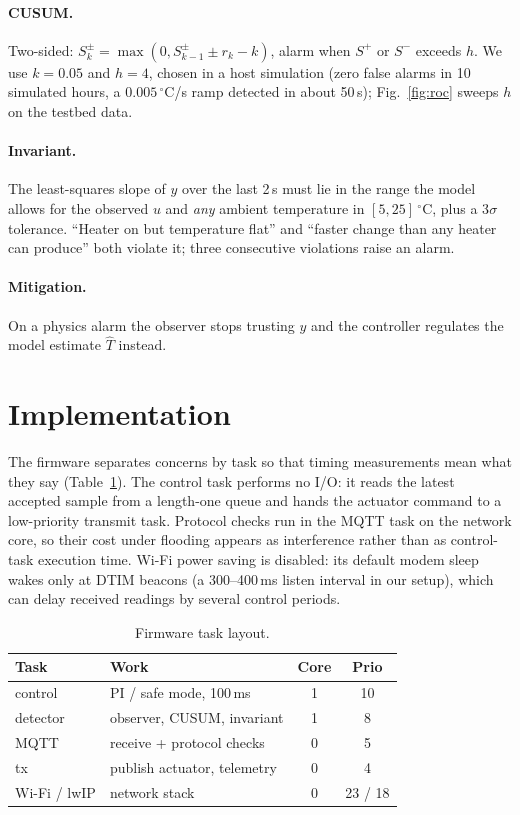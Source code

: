 \documentclass[10pt,twocolumn]{article}
\begin{document}
\paragraph{CUSUM.} Two-sided: $S^\pm_k = \max(0, S^\pm_{k-1} \pm r_k - k)$,
alarm when $S^+$ or $S^-$ exceeds $h$. We use $k=0.05$ and $h=4$, chosen in a
host simulation (zero false alarms in 10 simulated hours, a
$0.005\,^\circ$C/s ramp detected in about 50\,s); Fig.~\ref{fig:roc} sweeps $h$
on the testbed data.
\paragraph{Invariant.} The least-squares slope of $y$ over the last 2\,s must
lie in the range the model allows for the observed $u$ and \emph{any} ambient
temperature in $[5, 25]\,^\circ$C, plus a 3$\sigma$ tolerance. ``Heater on but
temperature flat'' and ``faster change than any heater can produce'' both
violate it; three consecutive violations raise an alarm.
\paragraph{Mitigation.} On a physics alarm the observer stops trusting $y$ and
the controller regulates the model estimate $\hat T$ instead.

\section{Implementation}
The firmware separates concerns by task so that timing measurements mean what
they say (Table~\ref{tab:tasks}). The control task performs no I/O: it reads the
latest accepted sample from a length-one queue and hands the actuator command
to a low-priority transmit task. Protocol checks run in the MQTT task on the
network core, so their cost under flooding appears as interference rather than
as control-task execution time. Wi-Fi power saving is disabled: its default
modem sleep wakes only at DTIM beacons (a 300--400\,ms listen interval in our
setup), which can delay received readings by several control periods.

\begin{table}[t]
\centering\small
\caption{Firmware task layout.}
\label{tab:tasks}
\begin{tabular}{llcc}
\toprule
Task & Work & Core & Prio \\
\midrule
control & PI / safe mode, 100\,ms & 1 & 10 \\
detector & observer, CUSUM, invariant & 1 & 8 \\
MQTT & receive + protocol checks & 0 & 5 \\
tx & publish actuator, telemetry & 0 & 4 \\
Wi-Fi / lwIP & network stack & 0 & 23 / 18 \\
\bottomrule
\end{tabular}
\end{table}
\end{document}
